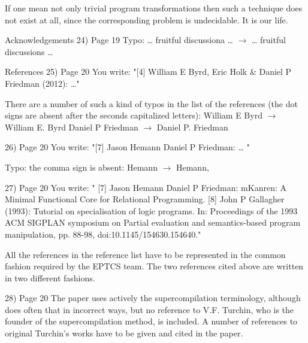 If one mean not only trivial program transformations then such a technique does not exist at all, since the corresponding problem is undecidable. It is our life.

Acknowledgements
24) Page 19
Typo: … fruitful discussiona … $\rightarrow$ … fruitful discussions …


References
25) Page 20
You write: "[4] William E Byrd, Eric Holk \& Daniel P Friedman (2012): …"

There are a number of such a kind of typos in the list of the references (the dot signs are absent after the seconds capitalized letters):
William E Byrd $\rightarrow$ William E. Byrd
Daniel P Friedman $\rightarrow$ Daniel P. Friedman

26) Page 20
You write: "[7] Jason Hemann Daniel P Friedman: … "

Typo: the comma sign is absent:
Hemann $\rightarrow$ Hemann,

27) Page 20
You write:
" [7] Jason Hemann Daniel P Friedman: mKanren: A Minimal Functional Core for Relational Programming.
  [8] John P Gallagher (1993): Tutorial on specialisation of logic programs. In: Proceedings of the 1993 ACM SIGPLAN symposium on Partial evaluation and semantics-based program manipulation, pp. 88-98, doi:10.1145/154630.154640."

All the references in the reference list have to be represented in the common fashion required by the EPTCS team. The two references cited above are written in two different fashions.


28) Page 20
The paper uses actively the supercompilation terminology, although does often that in incorrect ways, but no reference to V.F. Turchin, who is the founder of the supercompilation method, is included.
A number of references to original Turchin's works have to be given and cited in the paper.
